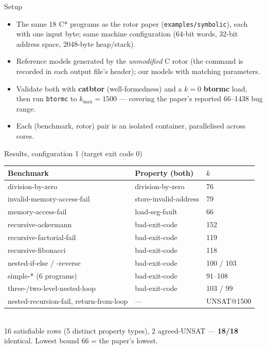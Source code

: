 \documentclass[aspectratio=169]{beamer}
\newcommand{\lab}[1]{{\footnotesize\color{ink!65}#1}}
\newcommand{\key}[1]{\textbf{\color{accentdk}#1}}
\begin{document}
\begin{frame}{Setup}
  \begin{itemize}\setlength\itemsep{0.3em}\footnotesize
    \item The same 18 C* programs as the rotor paper
          (\texttt{examples/symbolic}), each with one input byte; same machine
          configuration (64-bit words, 32-bit address space, 2048-byte
          heap/stack).
    \item Reference models generated by the \emph{unmodified} C rotor (the
          command is recorded in each output file's header); our models with
          matching parameters.
    \item Validate both with \key{catbtor} (well-formedness) and a $k{=}0$
          \key{btormc} load, then run \texttt{btormc} to $k_{\max}=1500$ ---
          covering the paper's reported 66--1438 bug range.
    \item Each (benchmark, rotor) pair is an isolated container, parallelised
          across cores.
  \end{itemize}
\end{frame}

\begin{frame}{Results, configuration 1 (target exit code 0)}
  \centering\scriptsize
  \begin{tabular}{lll}
    \toprule
    Benchmark & Property (both) & $k$\\
    \midrule
    division-by-zero & division-by-zero & 76\\
    invalid-memory-access-fail & store-invalid-address & 79\\
    memory-access-fail & load-seg-fault & 66\\
    recursive-ackermann & bad-exit-code & 152\\
    recursive-factorial-fail & bad-exit-code & 119\\
    recursive-fibonacci & bad-exit-code & 118\\
    nested-if-else / -reverse & bad-exit-code & 100 / 103\\
    simple-* (6 programs) & bad-exit-code & 91--108\\
    three-/two-level-nested-loop & bad-exit-code & 103 / 99\\
    nested-recursion-fail, return-from-loop & --- & UNSAT@1500\\
    \bottomrule
  \end{tabular}
  \vspace{0.4em}\\
  \lab{16 satisfiable rows (5 distinct property types), 2 agreed-UNSAT ---
       \textbf{18/18} identical. Lowest bound 66 = the paper's lowest.}
\end{frame}
\end{document}
